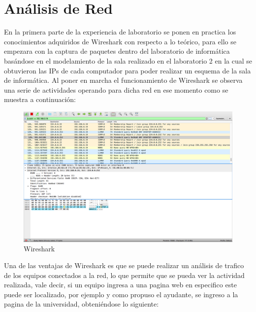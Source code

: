 \documentclass[spanish]{udpreport}
\begin{document}
\section{Análisis de Red}
En la primera parte de la experiencia de laboratorio se ponen en practica los conocimientos adquiridos de Wireshark con respecto a lo teórico, para ello se empezara con la captura de paquetes dentro del laboratorio de informática basándose en el modelamiento de la sala realizado en el laboratorio 2 en la cual se obtuvieron las IPs de cada computador para poder realizar un esquema de la sala de informática. Al poner en marcha el funcionamiento de Wireshark se observa una serie de actividades operando para dicha red en ese momento como se muestra a continuación:
\begin{figure}[h]
    \centering
    \includegraphics[scale=0.2]{images/wire1.png}
    \caption{Wireshark}
    \label{fig:my_label}
\end{figure}
\newpage
Una de las ventajas de Wireshark es que se puede realizar un análisis de trafico de los equipos conectados a la red, lo que permite que se pueda ver la actividad realizada, vale decir, si un equipo ingresa a una pagina web en especifico este puede ser localizado, por ejemplo y como propuso el ayudante, se ingreso a la pagina de la universidad, obteniéndose lo siguiente:
\end{document}
